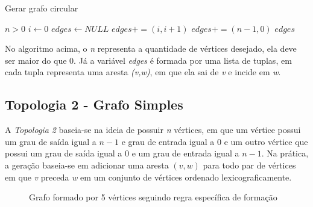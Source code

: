 \begin{algorithm}[H]
\caption{Gerar grafo circular}
\begin{algorithmic} 
\REQUIRE $n > 0$
\STATE $i \leftarrow 0$
\STATE $edges \leftarrow NULL$
\STATE $edges \mathrel{{+}{=}} (i, i + 1)$
\ENDIF
\ENDFOR
\STATE $edges \mathrel{{+}{=}} (n - 1, 0)$
\RETURN $edges$
\end{algorithmic}
\end{algorithm}

No algoritmo acima, o \emph{n} representa a quantidade de vértices desejado, ela deve ser maior do que 0. Já a variável \emph{edges} é formada por uma lista de tuplas, em cada tupla representa uma aresta \emph{(v,w)}, em que ela sai de \emph{v} e incide em \emph{w}.

\subsection{Topologia 2 - Grafo Simples}

A \emph{Topologia 2} baseia-se na ideia de possuir \emph{n} vértices, em que um vértice possui um grau de saída igual a \(n - 1\) e grau de entrada igual a 0 e um outro vértice que possui um grau de saída igual a 0 e um grau de entrada igual a \(n-1\). Na prática, a geração baseia-se em adicionar uma aresta \((v,w)\) para todo par de vértices em que \emph{v} preceda \emph{w} em um conjunto de vértices ordenado lexicograficamente.

\begin{figure}[hbt!]
    \centering
    \caption{Grafo formado por 5 vértices seguindo regra específica de formação}
    \label{fig:my_label}
\end{figure}

